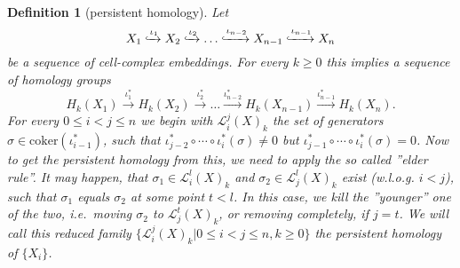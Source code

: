 \documentclass[11pt, a4paper, UKenglish]{article}
\newtheorem{definition}{Definition}
\newcommand{\coker}{\textrm{coker}}
\begin{document}
    \begin{definition}[persistent homology]
        Let \[X_1\xhookrightarrow{\iota_1} X_2\xhookrightarrow{\iota_2} \ldots\xhookrightarrow{\iota_{n-2}} X_{n-1}\xhookrightarrow{\iota_{n-1}} X_n\] be a sequence of cell-complex embeddings.
        For every $k\geq 0$ this implies a sequence of homology groups
        \[H_k(X_1)\xrightarrow{\iota_{1}^*} H_k(X_2)\xrightarrow{\iota_{2}^*}\ldots \xrightarrow{\iota_{n-2}^*} H_k(X_{n-1})\xrightarrow{\iota_{n-1}^*} H_k(X_n).\]
        For every $0\leq i<j\leq n$ we begin with $\mathcal{L}_i^j(X)_k$ the set of generators $\sigma\in\coker(\iota_{i-1}^*)$, such that $\iota_{j-2}^*\circ\cdots\circ\iota_{i}^*(\sigma)\neq0$ but $\iota_{j-1}^*\circ\cdots\circ\iota_{i}^*(\sigma)=0$.
        Now to get the persistent homology from this, we need to apply the so called ''elder rule''.
        It may happen, that $\sigma_1\in\mathcal{L}_i^l(X)_k$ and $\sigma_2\in\mathcal{L}_j^l(X)_k$ exist (w.l.o.g. $i<j$), such that $\sigma_1$ equals $\sigma_2$ at some point $t<l$.
        In this case, we kill the ''younger'' one of the two, i.e.\ moving $\sigma_2$ to $\mathcal{L}_j^t(X)_k$, or removing completely, if $j=t$.
        We will call this reduced family $\{\mathcal{L}_i^j(X)_k|0\leq i<j\leq n,k\geq0\}$ the persistent homology of $\{X_i\}$.
    \end{definition}
\end{document}
